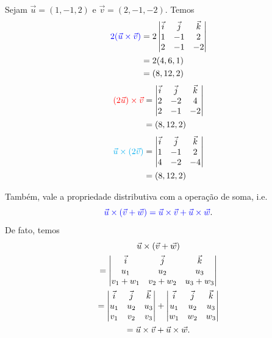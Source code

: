 \begin{ex}
  Sejam $\vec{u}=(1,-1,2)$ e $\vec{v}=(2,-1,-2)$. Temos
  \begin{align}
    {\color{blue}2(\vec{u}\times\vec{v})} &=
    2\begin{vmatrix}
      \vec{i} & \vec{j} & \vec{k} \\
      1 & -1 & 2 \\
      2 & -1 & -2
    \end{vmatrix}\\
                           &= 2(4,6,1)\\
                           &= (8,12,2)
  \end{align}
  \begin{align}
    {\color{red}(2\vec{u})\times\vec{v}} &=
    \begin{vmatrix}
      \vec{i} & \vec{j} & \vec{k} \\
      2 & -2 & 4 \\
      2 & -1 & -2
    \end{vmatrix}\\
                           &= (8,12,2)
  \end{align}
  \begin{align}
    {\color{cyan}\vec{u}\times(2\vec{v})} &=
    \begin{vmatrix}
      \vec{i} & \vec{j} & \vec{k} \\
      1 & -1 & 2 \\
      4 & -2 & -4
    \end{vmatrix}\\
                           &= (8,12,2)
  \end{align}
\end{ex}


Também, vale a {\color{blue}propriedade distributiva com a operação de soma}, i.e.
\begin{equation}
  {\color{blue}\vec{u}\times(\vec{v} + \vec{w}) = \vec{u}\times\vec{v}+\vec{u}\times\vec{w}}.
\end{equation}
De fato, temos
\begin{gather}
  \vec{u}\times(\vec{v}+\vec{w}) \\
  = \begin{vmatrix}
    \vec{i} & \vec{j} & \vec{k} \\
    u_1 & u_2 & u_3 \\
    v_1+w_1 & v_2+w_2 & u_3+w_3
  \end{vmatrix} \\
  = \begin{vmatrix}
    \vec{i} & \vec{j} & \vec{k} \\
    u_1 & u_2 & u_3 \\
    v_1 & v_2 & v_3
  \end{vmatrix}
  +  \begin{vmatrix}
    \vec{i} & \vec{j} & \vec{k} \\
    u_1 & u_2 & u_3 \\
    w_1 & w_2 & w_3
  \end{vmatrix}\\
  = \vec{u}\times\vec{v} + \vec{u}\times\vec{w}.
\end{gather}

